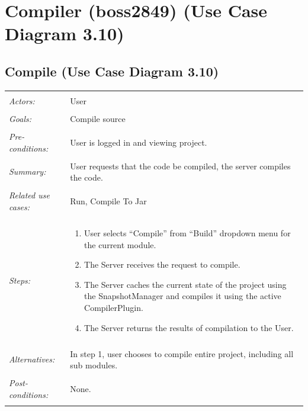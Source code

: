 \documentclass[11pt]{report}
\begin{document}
\section{Compiler (boss2849) (Use Case Diagram 3.10) }
\subsection{Compile (Use Case Diagram 3.10)}
\begin{tabular}{ p{2cm} p{12cm} }
    \hline
    \\
    \textit{Actors:} & User \\ 
    \\
    \textit{Goals:} & Compile source \\
    \\
    \textit{Pre-conditions:} & User is logged in and viewing project. \\
    \\
    \textit{Summary:} & User requests that the code be compiled, the server compiles the code. \\
    \\
    \textit{Related use cases:} & Run, Compile To Jar \\ 
    \\
    \textit{Steps:} & \begin{enumerate}
        \item User selects ``Compile'' from ``Build'' dropdown menu for the current module.
        \item The Server receives the request to compile.
        \item The Server caches the current state of the project using the SnapshotManager and compiles it using the active CompilerPlugin.
        \item The Server returns the results of compilation to the User.
    \end{enumerate} \\
    \\
    \textit{Alternatives:} & In step 1, user chooses to compile entire project, including all sub modules. \\
    \\
    \textit{Post-conditions:} & None. \\
    \\
    \hline
\end{tabular}
\end{document}
